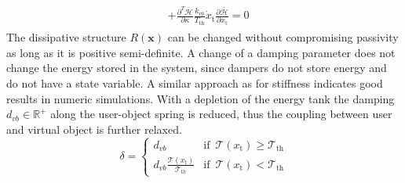 \documentclass[a4paper,twoside, openright,12pt]{report}
\newcommand{\f}[1]{\boldsymbol{#1}}
\newcommand{\g}[1]{\text{#1}}
\begin{document}
{\begin{eqnarray}
\begin{aligned}
  \\
 &+ \frac{\partial^T \bar{\mathcal{H}}}{\partial \kappa} \frac{k_{vb}}{T_{\g{th}}}\dot{x}_\g{t} \frac{\partial \bar{\mathcal{H}}}{\partial x_\g{t}}= 0
\end{aligned}
\end{eqnarray}
The dissipative structure $R(\f{x})$ can be changed without compromising passivity as long as it is positive semi-definite. A change of a damping parameter does not change the energy stored in the system, since dampers do not store energy and do not have a state variable. A similar approach as for stiffness indicates good results in numeric simulations. With a depletion of the energy tank the damping $d_{vb} \in \mathbb{R}^+$ along the user-object spring is reduced, thus the coupling between user and virtual object is further relaxed.
\begin{equation}
\delta = \begin{cases}
d_{vb} & \text{if } \, \mathcal{T}(x_\g{t})\geq \mathcal{T}_{\g{th}} \\
d_{vb} \frac{\mathcal{T}(x_\g{t})}{\mathcal{T}_{th}} & \text{if } \, \mathcal{T}(x_\g{t}) < \mathcal{T}_{\g{th}}
\end{cases}
\end{equation} 

}
\end{document}

